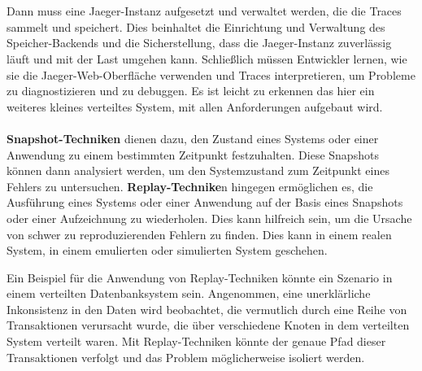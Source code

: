 \\\\
Dann muss eine Jaeger-Instanz aufgesetzt und verwaltet werden, die die Traces sammelt und speichert. Dies beinhaltet die Einrichtung und Verwaltung des Speicher-Backends und die Sicherstellung, dass die Jaeger-Instanz zuverlässig läuft und mit der Last umgehen kann. Schließlich müssen Entwickler lernen, wie sie die Jaeger-Web-Oberfläche verwenden und Traces interpretieren, um Probleme zu diagnostizieren und zu debuggen.
Es ist leicht zu erkennen das hier ein weiteres kleines verteiltes System, mit allen Anforderungen aufgebaut wird. 
\\\\
\textbf{Snapshot-Techniken} dienen dazu, den Zustand eines Systems oder einer Anwendung zu einem bestimmten Zeitpunkt festzuhalten. Diese Snapshots können dann analysiert werden, um den Systemzustand zum Zeitpunkt eines Fehlers zu untersuchen. \textbf{Replay-Technike}n hingegen ermöglichen es, die Ausführung eines Systems oder einer Anwendung auf der Basis eines Snapshots oder einer Aufzeichnung zu wiederholen. Dies kann hilfreich sein, um die Ursache von schwer zu reproduzierenden Fehlern zu finden. Dies kann in einem realen System, in einem emulierten oder simulierten System geschehen. 

Ein Beispiel für die Anwendung von Replay-Techniken könnte ein Szenario in einem verteilten Datenbanksystem sein. Angenommen, eine unerklärliche Inkonsistenz in den Daten wird beobachtet, die vermutlich durch eine Reihe von Transaktionen verursacht wurde, die über verschiedene Knoten in dem verteilten System verteilt waren. Mit Replay-Techniken könnte der genaue Pfad dieser Transaktionen verfolgt und das Problem möglicherweise isoliert werden.

